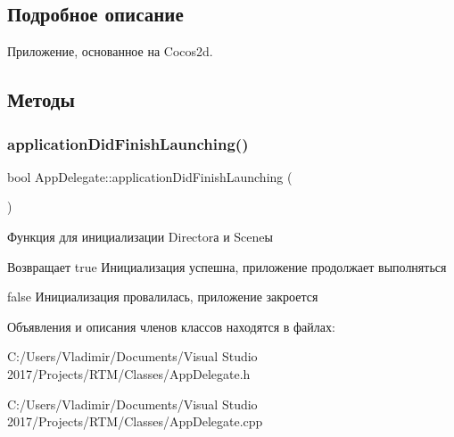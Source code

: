 \subsection{Подробное описание}
Приложение, основанное на Cocos2d. 

\subsection{Методы}
\mbox{\label{class_app_delegate_a68cbaed49edf7581dc59a09d5062fff3}} 
\subsubsection{\texorpdfstring{application\+Did\+Finish\+Launching()}{applicationDidFinishLaunching()}}
{\footnotesize\ttfamily bool App\+Delegate\+::application\+Did\+Finish\+Launching (\begin{DoxyParamCaption}{ }\end{DoxyParamCaption})\hspace{0.3cm}{\ttfamily [virtual]}}



Функция для инициализации Director\textquotesingle{}а и Scene\textquotesingle{}ы 

\begin{DoxyReturn}{Возвращает}
true Инициализация успешна, приложение продолжает выполняться 

false Инициализация провалилась, приложение закроется 
\end{DoxyReturn}


Объявления и описания членов классов находятся в файлах\+:\begin{DoxyCompactItemize}
\item 
C\+:/\+Users/\+Vladimir/\+Documents/\+Visual Studio 2017/\+Projects/\+R\+T\+M/\+Classes/App\+Delegate.\+h\item 
C\+:/\+Users/\+Vladimir/\+Documents/\+Visual Studio 2017/\+Projects/\+R\+T\+M/\+Classes/App\+Delegate.\+cpp\end{DoxyCompactItemize}
